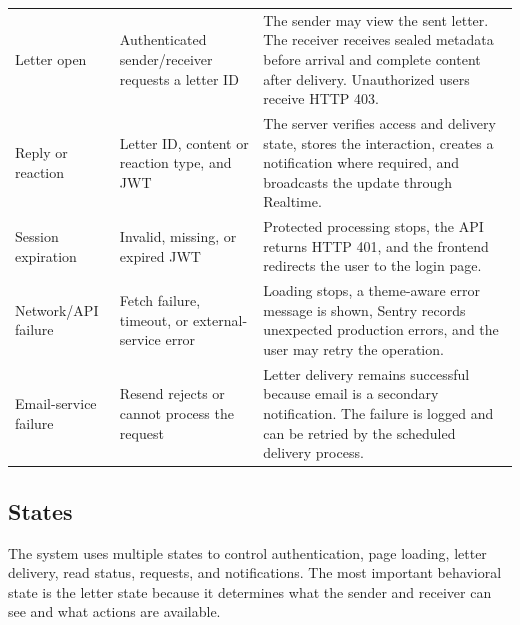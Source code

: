 ﻿\documentclass[12pt,a4paper]{report}
\begin{document}
\begin{longtable}{p{3.2cm} p{4cm} p{6.5cm}}
Letter open & Authenticated sender/receiver requests a letter ID & The sender may view the sent letter. The receiver receives sealed metadata before arrival and complete content after delivery. Unauthorized users receive HTTP 403. \\
Reply or reaction & Letter ID, content or reaction type, and JWT & The server verifies access and delivery state, stores the interaction, creates a notification where required, and broadcasts the update through Realtime. \\
Session expiration & Invalid, missing, or expired JWT & Protected processing stops, the API returns HTTP 401, and the frontend redirects the user to the login page. \\
Network/API failure & Fetch failure, timeout, or external-service error & Loading stops, a theme-aware error message is shown, Sentry records unexpected production errors, and the user may retry the operation. \\
Email-service failure & Resend rejects or cannot process the request & Letter delivery remains successful because email is a secondary notification. The failure is logged and can be retried by the scheduled delivery process. \\
\bottomrule
\end{longtable}

\subsection{States}

The system uses multiple states to control authentication, page loading, letter delivery, read status, requests, and notifications. The most important behavioral state is the letter state because it determines what the sender and receiver can see and what actions are available.
\end{document}
